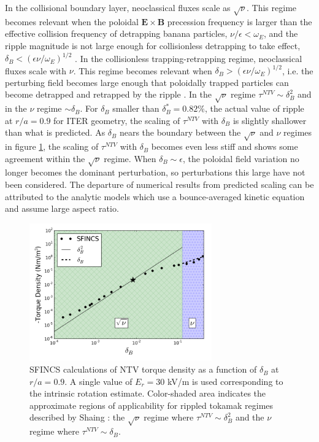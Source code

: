 \documentclass{article}
\numberwithin{figure}{section}
\numberwithin{equation}{section}
\begin{document}
In the collisional boundary layer, neoclassical fluxes scale as $\sqrt{\nu}$. This regime becomes relevant when the poloidal $\bm{E} \times \bm{B}$ precession frequency is larger than the effective collision frequency of detrapping banana particles, $\nu/\epsilon < \omega_E$, and the ripple magnitude is not large enough for collisionless detrapping to take effect, $\delta_B < \left(  \epsilon \nu/\omega_E \right)^{1/2}$ \cite{Shaing2008}. 
In the collisionless trapping-retrapping regime, neoclassical fluxes scale with $\nu$. This regime becomes relevant when $\delta_B > \left(  \epsilon \nu/\omega_E \right)^{1/2}$, i.e. the perturbing field becomes large enough that poloidally trapped particles can become detrapped and retrapped by the ripple \cite{Shaing2010}. In the $\sqrt{\nu}$ regime $\tau^{NTV} \sim \delta_B^2$ and in the $\nu$ regime $\sim \delta_B$. For $\delta_B$ smaller than $\delta_B^* = 0.82\%$, the actual value of ripple at $r/a=0.9$ for ITER geometry, the scaling of $\tau^{NTV}$ with $\delta_B$ is slightly shallower than what is predicted. 
As $\delta_B$ nears the boundary between the $\sqrt{\nu}$ and $\nu$ regimes in figure \ref{fig:scalescan}, the scaling of $\tau^{NTV}$ with $\delta_B$ becomes even less stiff and shows some agreement within the $\sqrt{\nu}$ regime. When $\delta_B \sim \epsilon$, the poloidal field variation no longer becomes the dominant perturbation, so perturbations this large have not been considered. The departure of numerical results from predicted scaling can be attributed to the analytic models which use a bounce-averaged kinetic equation and assume large aspect ratio. 

\begin{figure}[h!]
\centering
\includegraphics[width=0.7\textwidth]
{scalescan.png}
\caption{\label{fig:scalescan} SFINCS calculations of NTV torque density as a function of $\delta_B$ at $r/a = 0.9$. A single value of $E_r = 30$ kV/m is used corresponding to the intrinsic rotation estimate. Color-shaded area indicates the approximate regions of applicability for rippled tokamak regimes described by Shaing \cite{Shaing2010, Shaing2008}: the $\sqrt{\nu}$ regime where $\tau^{NTV} \sim \delta_B^2$ and the $\nu$ regime where $\tau^{NTV} \sim \delta_B$. }
\end{figure} 
\end{document}
